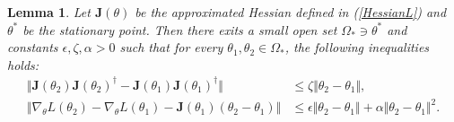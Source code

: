 \documentclass[a4paper, 11pt]{article}
\numberwithin{equation}{section}
\newtheorem{lemma}{\textbf{Lemma}}
\begin{document}
\begin{lemma} \label{lemma6}
Let $\boldsymbol{J} (\theta)$ be the approximated  Hessian defined in (\ref{HessianL}) and $\theta^*$ be the stationary point. Then there exits a small open set $\Omega_{*} \ni \theta^*$ and constants $\epsilon, \zeta, \alpha > 0$ such that for every $\theta_1, \theta_2 \in \Omega_{*}$, the following inequalities holds:
\begin{align}
\Vert \boldsymbol{J} (\theta_2)  \boldsymbol{J} (\theta_2) ^{\dagger} - \boldsymbol{J} (\theta_1)  \boldsymbol{J} (\theta_1) ^{\dagger} \Vert &\leq \zeta \Vert \theta_2 - \theta_1 \Vert, \\
\Vert \nabla_{\theta}L(\theta_2)  - \nabla_{\theta}L(\theta_1)  - \boldsymbol{J} (\theta_1) \left( \theta_2 - \theta_1 \right) \Vert &\leq  \epsilon \Vert \theta_2 - \theta_1 \Vert + \alpha \Vert \theta_2 - \theta_1 \Vert^2.
\end{align}
\end{lemma}
\end{document}
